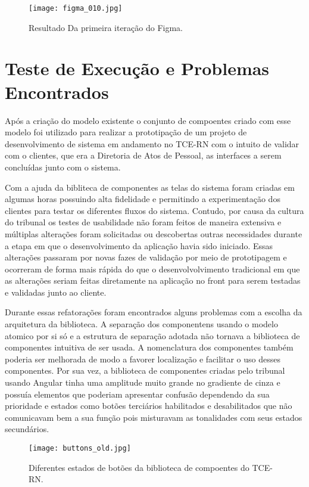   \begin{figure}[h!]
    \texttt{[image: figma\_010.jpg]}
    \caption{Resultado Da primeira iteração do Figma.}
    \label{fig:tcenglib}
  \end{figure}

\section{Teste de Execução e Problemas Encontrados} \label{secao33}

  Após a criação do modelo existente o conjunto de compoentes criado com esse modelo foi utilizado para realizar a prototipação de um projeto de desenvolvimento de sistema em andamento no TCE-RN com o intuito de validar com o clientes, que era a Diretoria de Atos de Pessoal, as interfaces a serem concluídas junto com o sistema.

  Com a ajuda da bibliteca de componentes as telas do sistema foram criadas em algumas horas possuindo alta fidelidade e permitindo a experimentação dos clientes para testar os diferentes fluxos do sistema. Contudo, por causa da cultura do tribunal os testes de usabilidade não foram feitos de maneira extensiva e múltiplas alterações foram solicitadas ou descobertas outras necessidades durante a etapa em que o desenvolvimento da aplicação havia sido iniciado. Essas alterações passaram por novas fazes de validação por meio de prototipagem e ocorreram de forma mais rápida do que o desenvolvolvimento tradicional em que as alterações seriam feitas diretamente na aplicação no front para serem testadas e validadas junto ao cliente.

  Durante essas refatorações foram encontrados alguns problemas com a escolha da arquitetura da biblioteca. A separação dos componentens usando o modelo atomico por si só e a estrutura de separação adotada não tornava a biblioteca de componentes intuitiva de ser usada. A nomenclatura dos componentes também poderia ser melhorada de modo a favorer localização e facilitar o uso desses componentes.
  Por sua vez, a biblioteca de componentes criadas pelo tribunal usando Angular tinha uma amplitude muito grande no gradiente de cinza e possuía elementos que poderiam apresentar confusão dependendo da sua prioridade e estados como botões terciários habilitados e desabilitados que não comunicavam bem a sua função pois misturavam as tonalidades com seus estados secundários.

  \begin{figure}[h!]
    \texttt{[image: buttons\_old.jpg]}
    \caption{Diferentes estados de botões da biblioteca de compoentes do TCE-RN.}
    \label{fig:buttons_old}
  \end{figure}

